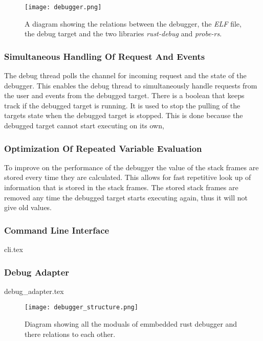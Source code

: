\begin{figure}[h]
	\centering
	\texttt{[image: debugger.png]}
	\caption{A diagram showing the relations between the debugger, the \emph{ELF} file, the debug target and the two libraries \emph{rust-debug} and \emph{probe-rs}.}
	\label{fig:debugger}
\end{figure}


\subsubsection{Simultaneous Handling Of Request And Events}
The debug thread polls the channel for incoming request and the state of the debugger.
This enables the debug thread to simultaneously handle requests from the user and events from the debugged target.
There is a boolean that keeps track if the debugged target is running.
It is used to stop the pulling of the targets state when the debugged target is stopped.
This is done because the debugged target cannot start executing on its own,


\subsubsection{Optimization Of Repeated Variable Evaluation}
To improve on the performance of the debugger the value of the stack frames are stored every time they are calculated.
This allows for fast repetitive look up of information that is stored in the stack frames.
The stored stack frames are removed any time the debugged target starts executing again, thus it will not give old values.




\subsubsection{Command Line Interface}
{cli.tex}


\subsubsection{Debug Adapter}
{debug_adapter.tex}


\begin{figure}[h]
	\centering
	\texttt{[image: debugger\_structure.png]}
	\caption{Diagram showing all the moduals of emmbedded rust debugger and there relations to each other.}
	\label{fig:EDBStruct}
\end{figure}

